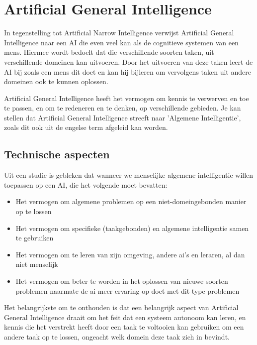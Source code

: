 \section{Artificial General Intelligence}

In tegenstelling tot Artificial Narrow Intelligence verwijst Artificial General Intelligence naar een AI die even veel kan als de cognitieve systemen van een mens. Hiermee wordt bedoelt dat die verschillende soorten taken, uit verschillende domeinen kan uitvoeren. Door het uitvoeren van deze taken leert de AI bij zoals een mens dit doet en kan hij bijleren om vervolgens taken uit andere domeinen ook te kunnen oplossen. 

Artificial General Intelligence heeft het vermogen om kennis te verwerven en toe te passen, en om te redeneren en te denken, op verschillende gebieden. Je kan stellen dat Artificial General Intelligence streeft naar 'Algemene Intelligentie', zoals dit ook uit de engelse term afgeleid kan worden. 



\subsection{Technische aspecten}

Uit een studie is gebleken dat wanneer we menselijke algemene intelligentie willen toepassen op een AI, die het volgende moet bevatten: \linebreak

\begin{itemize}
    \item Het vermogen om algemene problemen op een niet-domeingebonden manier op te lossen
    \item Het vermogen om specifieke (taakgebonden) en algemene intelligentie samen te gebruiken
    \item Het vermogen om te leren van zijn omgeving, andere ai's en leraren, al dan niet menselijk
    \item Het vermogen om beter te worden in het oplossen van nieuwe soorten problemen naarmate de ai meer ervaring op doet met dit type problemen
\end{itemize}

Het belangrijkste om te onthouden is dat een belangrijk aspect van Artificial General Intelligence draait om het feit dat een systeem autonoom kan leren, en kennis die het verstrekt heeft door een taak te voltooien kan gebruiken om een andere taak op te lossen, ongeacht welk domein deze taak zich in bevindt. 

